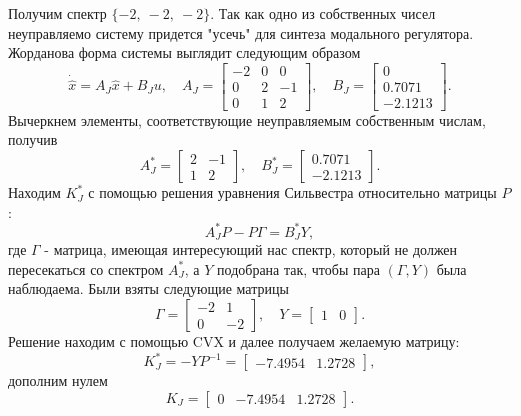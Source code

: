 Получим спектр $\{-2,\ -2,\ -2\}$. Так как одно из собственных чисел неуправляемо систему
придется "усечь" для синтеза модального регулятора.
Жорданова форма системы выглядит следующим образом
\begin{equation*}
    \dot{\hat x} = A_J\hat x+B_Ju,\quad A_J=\begin{bmatrix}
        -2&     0 &    0\\
        0  &   2 &   -1\\
        0   &  1&     2
    \end{bmatrix},\quad
    B_J=\begin{bmatrix}
        0\\
        0.7071\\
       -2.1213
    \end{bmatrix}.
\end{equation*}
Вычеркнем элементы, соответствующие неуправляемым 
собственным числам, получив
\begin{equation*}
    A_J^*=\begin{bmatrix}
        2 & -1 \\ 1 & 2
    \end{bmatrix},\quad
    B_J^*=\begin{bmatrix}
        0.7071\\
       -2.1213
    \end{bmatrix}.
\end{equation*}
Находим $K_J^*$ с помощью решения уравнения Сильвестра относительно матрицы $P$:
\begin{equation*}
    A_J^*P-P\Gamma = B_J^*Y,
\end{equation*}
где $\Gamma$ - матрица, имеющая интересующий нас спектр, который не должен пересекаться
со спектром $A_J^*$, а $Y$ подобрана так, чтобы
пара $(\Gamma, Y)$ была наблюдаема. Были взяты следующие матрицы
\begin{equation*}
    \Gamma=\begin{bmatrix}
        -2&  1\\
        0& -2
    \end{bmatrix},\quad
    Y=\begin{bmatrix}
        1& 0
    \end{bmatrix}.
\end{equation*}
Решение находим с помощью CVX и далее получаем
желаемую матрицу:
\begin{equation*}
    K_J^*=-YP^{-1}=\begin{bmatrix}
        -7.4954&     1.2728
    \end{bmatrix},
\end{equation*}
дополним нулем
\begin{equation*}
    K_J=\begin{bmatrix}
        0 & -7.4954&     1.2728
    \end{bmatrix}.
\end{equation*}

